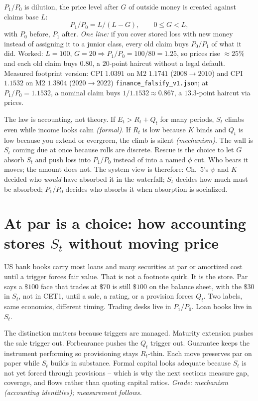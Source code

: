 $P_1/P_0$ is dilution, the price level after $G$ of outside money is created against claims base $L$:
\begin{equation}
P_1/P_0 = L/(L-G),\qquad 0\le G<L,
\label{eq:P6}
\end{equation}
with $P_0$ before, $P_1$ after. \textit{One line:} if you cover stored loss with new money instead of assigning it to a junior class, every old claim buys $P_0/P_1$ of what it did. Worked: $L=100$, $G=20\Rightarrow P_1/P_0=100/80=1.25$, so prices rise $\approx25\%$ and each old claim buys $0.80$, a $20$-point haircut without a legal default. Measured footprint version: CPI $1.0391$ on M2 $1.1741$ ($2008\to2010$) and CPI $1.1532$ on M2 $1.3804$ ($2020\to2022$) \texttt{finance\_falsify\_v1.json}; at $P_1/P_0=1.1532$, a nominal claim buys $1/1.1532\approx0.867$, a $13.3$-point haircut via prices.

The law is accounting, not theory. If $E_t>R_t+Q_t$ for many periods, $S_t$ climbs even while income looks calm \textit{(formal)}. If $R_t$ is low because $K$ binds and $Q_t$ is low because you extend or evergreen, the climb is silent \textit{(mechanism)}. The wall is $S_t$ coming due at once because rolls are discrete. Rescue is the choice to let $G$ absorb $S_t$ and push loss into $P_1/P_0$ instead of into a named $\phi$ cut. Who bears it moves; the amount does not. The system view is therefore: Ch.~5's $\psi$ and $K$ decided who \textit{would} have absorbed it in the waterfall; $S_t$ decides how much must be absorbed; $P_1/P_0$ decides who absorbs it when absorption is socialized.

\section{At par is a choice: how accounting stores $S_t$ without moving price}
\label{sec:par}

US bank books carry most loans and many securities at par or amortized cost until a trigger forces fair value. That is not a footnote quirk. It is the store. Par says a $\$100$ face that trades at $\$70$ is still $\$100$ on the balance sheet, with the $\$30$ in $S_t$, not in CET1, until a sale, a rating, or a provision forces $Q_t$. Two labels, same economics, different timing. Trading desks live in $P_1/P_0$. Loan books live in $S_t$.

The distinction matters because triggers are managed. Maturity extension pushes the sale trigger out. Forbearance pushes the $Q_t$ trigger out. Guarantee keeps the instrument performing so provisioning stays $R_t$-thin. Each move preserves par on paper while $S_t$ builds in substance. Formal capital looks adequate because $S_t$ is not yet forced through provisions -- which is why the next sections measure gap, coverage, and flows rather than quoting capital ratios. \textit{Grade: mechanism (accounting identities); measurement follows.}

